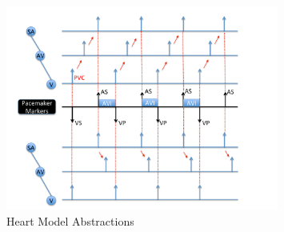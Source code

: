 \begin{figure}[!t]
		\centering
		\includegraphics[width=0.8\textwidth]{figs/ambiguity.pdf}
		\caption{\small Heart Model Abstractions}
		\label{fig:C_ambiguity}
\end{figure}



